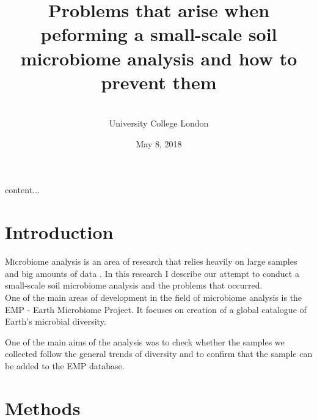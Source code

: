 \documentclass{article}
\title{Problems that arise when peforming a small-scale soil microbiome analysis and how to prevent them}
\author{
\\
\normalsize University College London \\
}
\date{May 8, 2018}
\begin{document}
\maketitle


\begin{multicols}{2}
	content...

\section{Introduction}

\lettrine[nindent=0em,lines=3]{M}icrobiome analysis is an area of research that relies heavily on large samples and big amounts of data \cite{Thompson2017}. In this research I describe our attempt to conduct a small-scale soil microbiome analysis and the problems that occurred.\\
One of the main areas of development in the field of microbiome analysis is the EMP - Earth Microbiome Project\cite{Gilbert2014}. It focuses on creation of a global catalogue of Earth's microbial diversity.


One of the main aims of the analysis was to check whether the samples we collected follow the general trends of diversity and to confirm that the sample can be added to the EMP database.


\section{Methods}


\end{multicols}
\end{document}
